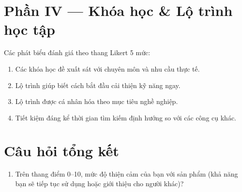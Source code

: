 \section*{Phần IV --- Khóa học \& Lộ trình học tập}

\noindent Các phát biểu đánh giá theo thang Likert 5 mức:

\begin{enumerate}
    \item Các khóa học đề xuất sát với chuyên môn và nhu cầu thực tế.
    \item Lộ trình giúp biết cách bắt đầu cải thiện kỹ năng ngay.
    \item Lộ trình được cá nhân hóa theo mục tiêu nghề nghiệp.
    \item Tiết kiệm đáng kể thời gian tìm kiếm định hướng so với các công cụ khác.
\end{enumerate}

\section*{Câu hỏi tổng kết}

\begin{enumerate}
    \item Trên thang điểm 0--10, mức độ thiện cảm của bạn với sản phẩm (khả năng bạn sẽ tiếp tục sử dụng hoặc giới thiệu cho người khác)?
\end{enumerate}
